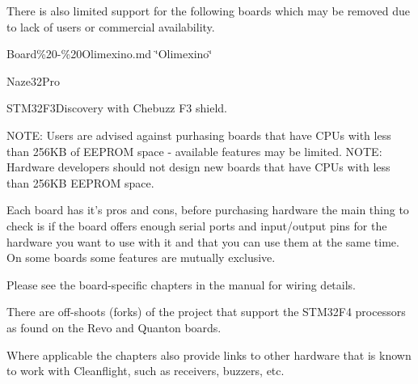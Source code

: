 There is also limited support for the following boards which may be removed due to lack of users or commercial availability.


\begin{DoxyItemize}
\item Board\%20-\/\%20\+Olimexino.\+md \char`\"{}\+Olimexino\char`\"{}
\item Naze32\+Pro
\item S\+T\+M32\+F3\+Discovery with Chebuzz F3 shield.
\end{DoxyItemize}

N\+O\+T\+E\+: Users are advised against purhasing boards that have C\+P\+Us with less than 256\+K\+B of E\+E\+P\+R\+O\+M space -\/ available features may be limited. N\+O\+T\+E\+: Hardware developers should not design new boards that have C\+P\+Us with less than 256\+K\+B E\+E\+P\+R\+O\+M space.

Each board has it's pros and cons, before purchasing hardware the main thing to check is if the board offers enough serial ports and input/output pins for the hardware you want to use with it and that you can use them at the same time. On some boards some features are mutually exclusive.

Please see the board-\/specific chapters in the manual for wiring details.

There are off-\/shoots (forks) of the project that support the S\+T\+M32\+F4 processors as found on the Revo and Quanton boards.

Where applicable the chapters also provide links to other hardware that is known to work with Cleanflight, such as receivers, buzzers, etc. 